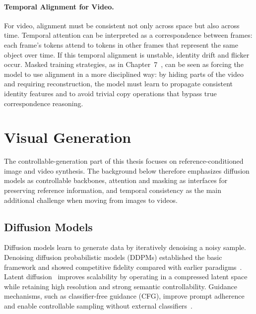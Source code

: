 \paragraph{Temporal Alignment for Video.}
For video, alignment must be consistent not only across space but also across time. Temporal attention can be interpreted as a correspondence between frames: each frame's tokens attend to tokens in other frames that represent the same object over time. If this temporal alignment is unstable, identity drift and flicker occur. Masked training strategies, as in Chapter~7~\citep{zhou2025scaling}, can be seen as forcing the model to use alignment in a more disciplined way: by hiding parts of the video and requiring reconstruction, the model must learn to propagate consistent identity features and to avoid trivial copy operations that bypass true correspondence reasoning.

\section{Visual Generation}
The controllable-generation part of this thesis focuses on reference-conditioned image and video synthesis. The background below therefore emphasizes diffusion models as controllable backbones, attention and masking as interfaces for preserving reference information, and temporal consistency as the main additional challenge when moving from images to videos.

\subsection{Diffusion Models}
Diffusion models learn to generate data by iteratively denoising a noisy sample. Denoising diffusion probabilistic models (DDPMs) established the basic framework and showed competitive fidelity compared with earlier paradigms~\citep{ho2020denoising}. Latent diffusion~\citep{rombach2022high} improves scalability by operating in a compressed latent space while retaining high resolution and strong semantic controllability. Guidance mechanisms, such as classifier-free guidance (CFG), improve prompt adherence and enable controllable sampling without external classifiers~\citep{ho2022classifier}.

